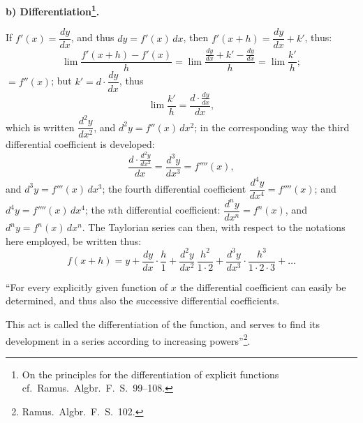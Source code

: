 \documentclass[12pt]{book}
\begin{document}
\begin{center}
\textbf{b) Differentiation\footnote{On the principles for the differentiation of
explicit functions cf.\ Ramus.\ Algbr.\ F.\ S.\ 99--108.}.}
\end{center}
{}

If $f'(x) = \dfrac{dy}{dx}$, and thus $dy = f'(x)\,dx$, then
$f'(x + h) = \dfrac{dy}{dx} + k'$, thus:
\[
\lim\frac{f'(x + h) - f'(x)}{h} = \lim\frac{\frac{dy}{dx} + k' - \frac{dy}{dx}}{h}
= \lim\frac{k'}{h};
\]
$= f''(x)$; but $k' = d\cdot\dfrac{dy}{dx}$,
thus
\[
\lim\frac{k'}{h} = \frac{d\cdot\frac{dy}{dx}}{dx},
\]
which is written $\dfrac{d^{2}y}{dx^{2}}$, and $d^{2}y = f''(x)\,dx^{2}$; in the
corresponding way the third differential coefficient is developed:
\[
\frac{d\cdot\frac{d^{2}y}{dx^{2}}}{dx} = \frac{d^{3}y}{dx^{3}} = f''''(x),
\]
and $d^{3}y = f'''(x)\,dx^{3}$; the fourth differential coefficient
$\dfrac{d^{4}y}{dx^{4}} = f''''(x)$; and $d^{4}y = f''''(x)\,dx^{4}$; the $n$th
differential coefficient: $\dfrac{d^{n}y}{dx^{n}} = f^{n}(x)$, and
$d^{n}y = f^{n}(x)\,dx^{n}$. The Taylorian series can then, with respect to the
notations here employed, be written thus:
\[
f(x + h) = y + \frac{dy}{dx}\cdot\frac{h}{1} + \frac{d^{2}y}{dx^{2}}\,
\frac{h^{2}}{1\cdot2} + \frac{d^{3}y}{dx^{3}}\cdot\frac{h^{3}}{1\cdot2\cdot3} + \dots
\]

``For every explicitly given function of $x$ the differential coefficient can easily
be determined, and thus also the successive differential coefficients.

This act is called the differentiation of the function, and serves to find its
development in a series according to increasing powers''\footnote{Ramus.\ Algbr.\ F.\
S.\ 102.}.
\end{document}
